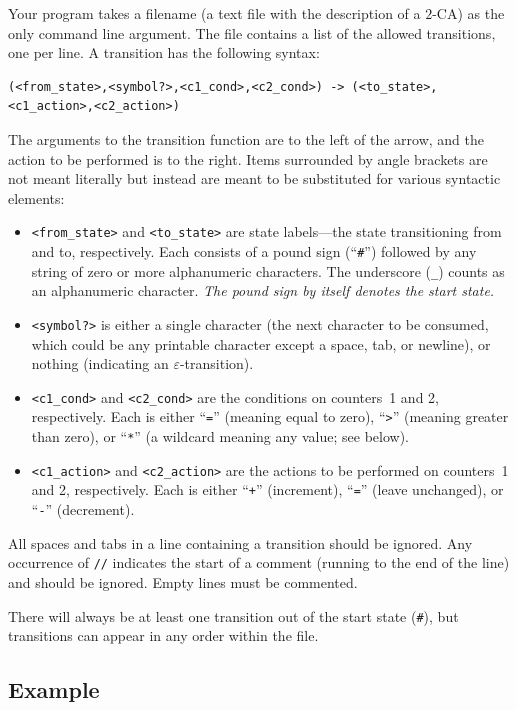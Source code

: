 \documentclass[11pt]{article}
\newcommand{\emptystr}{\varepsilon}
\renewcommand{\t}[1]{\texttt{#1}}
\theoremstyle{definition}
\begin{document}
Your program takes a filename (a text file with the description of a $2$-CA) as the only command line argument.  The file contains a list of the allowed transitions, one per line.  A transition has the following syntax:
\begin{verbatim}
(<from_state>,<symbol?>,<c1_cond>,<c2_cond>) -> (<to_state>,<c1_action>,<c2_action>)
\end{verbatim}
The arguments to the transition function are to the left of the arrow, and the action to be performed is to the right.  Items surrounded by angle brackets are not meant literally but instead are meant to be substituted for various syntactic elements:
\begin{itemize}
\item
\t{<from\_state>} and \t{<to\_state>} are state labels---the state transitioning from and to, respectively.  Each consists of a pound sign (``\t\#'') followed by any string of zero or more alphanumeric characters.  The underscore (\verb+_+) counts as an alphanumeric character.  \emph{The pound sign by itself denotes the start state.}
\item
\t{<symbol?>} is either a single character (the next character to be consumed, which could be any printable character except a space, tab, or newline), or nothing (indicating an $\emptystr$-transition).
\item
\t{<c1\_cond>} and \t{<c2\_cond>} are the conditions on counters~1 and 2, respectively.  Each is either ``\t{=}'' (meaning equal to zero), ``\t{>}'' (meaning greater than zero), or ``\t{*}'' (a wildcard meaning any value; see below).
\item
\t{<c1\_action>} and \t{<c2\_action>} are the actions to be performed on counters~1 and 2, respectively.  Each is either ``\t{+}'' (increment), ``\t{=}'' (leave unchanged), or ``\t{-}'' (decrement).
\end{itemize}
All spaces and tabs in a line containing a transition should be ignored.  Any occurrence of \t{//} indicates the start of a comment (running to the end of the line) and should be ignored.  Empty lines must be commented.

There will always be at least one transition out of the start state (\t{\#}), but transitions can appear in any order within the file.

\subsection{Example}
\end{document}

